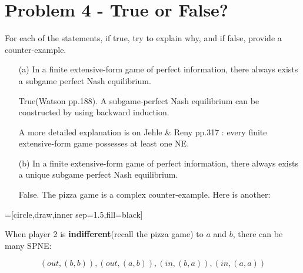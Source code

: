 \documentclass{article}
\begin{document}
\bigskip

\section{Problem 4 - True or False?}

For each of the statements, if true, try to explain why, and if false, provide a
counter-example.

\begin{itemize}
%
\item[(a)] In a finite extensive-form game of perfect information, there always exists a subgame perfect Nash equilibrium. 

\medskip

True(Watson pp.188). A subgame-perfect Nash equilibrium can be constructed by using backward induction.

\begin{mdframed}[backgroundcolor=blue!20,linecolor=white]
A more detailed explanation is on Jehle \& Reny pp.317 : every finite extensive-form game possesses at least one NE.
\end{mdframed}

\item[(b)] In a finite extensive-form game of perfect information, there always exists a unique subgame perfect Nash equilibrium.  
\medskip

False. The pizza game is a complex counter-example. Here is another:

\end{itemize}

\begin{center}
=[circle,draw,inner sep=1.5,fill=black]
\label{fig:example}
\end{center}

When player 2 is \textbf{indifferent}(recall the pizza game) to $a$ and $b$, there can be many SPNE:

$$(out,(b,b)),(out,(a,b)),(in,(b,a)),(in,(a,a))$$
\end{document}
